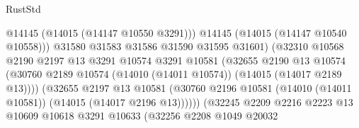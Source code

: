 \begin{lexlean}{RustStd}
\begin{coremodule}
                                              @14145
                                              (@14015 (@14147 @10550 @3291)))
                                            @14145
                                            (@14015 (@14147 @10540 @10558)))
                                          @31580
                                          @31583
                                          @31586
                                          @31590
                                          @31595
                                          @31601)
                                        (@32310
                                          @10568
                                          @2190
                                          @2197
                                          @13
                                          @3291
                                          @10574
                                          @3291
                                          @10581
                                          (@32655
                                            @2190
                                            @13
                                            @10574
                                            (@30760
                                              @2189
                                              @10574
                                              (@14010 (@14011 @10574))
                                              (@14015 (@14017 @2189 @13))))
                                          (@32655
                                            @2197
                                            @13
                                            @10581
                                            (@30760
                                              @2196
                                              @10581
                                              (@14010 (@14011 @10581))
                                              (@14015 (@14017 @2196 @13))))))
                                      (@32245
                                        @2209
                                        @2216
                                        @2223
                                        @13
                                        @10609
                                        @10618
                                        @3291
                                        @10633
                                        (@32256
                                          @2208
                                          @1049
                                          @20032

\end{coremodule}
\end{lexlean}
